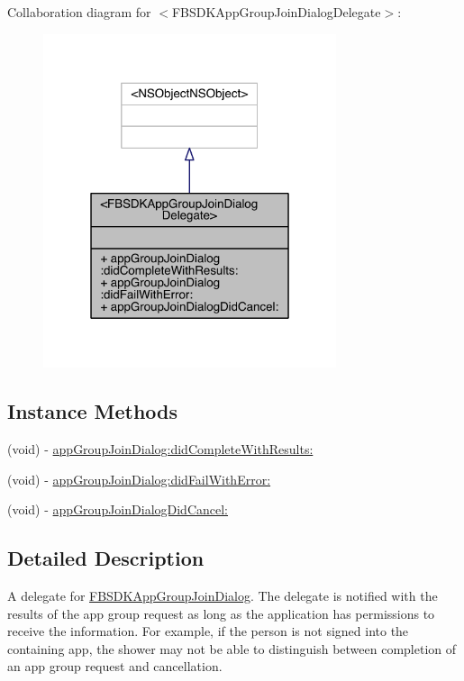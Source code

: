 Collaboration diagram for $<$F\-B\-S\-D\-K\-App\-Group\-Join\-Dialog\-Delegate$>$\-:
\nopagebreak
\begin{figure}[H]
\begin{center}
\leavevmode
\includegraphics[width=244pt]{protocol_f_b_s_d_k_app_group_join_dialog_delegate-p__coll__graph}
\end{center}
\end{figure}
\subsection*{Instance Methods}
\begin{DoxyCompactItemize}
\item 
(void) -\/ \hyperlink{protocol_f_b_s_d_k_app_group_join_dialog_delegate-p_a809da42b13fb800917b7b96b30ac4341}{app\-Group\-Join\-Dialog\-:did\-Complete\-With\-Results\-:}
\item 
(void) -\/ \hyperlink{protocol_f_b_s_d_k_app_group_join_dialog_delegate-p_a317e412e820965fdb565aac33f485172}{app\-Group\-Join\-Dialog\-:did\-Fail\-With\-Error\-:}
\item 
(void) -\/ \hyperlink{protocol_f_b_s_d_k_app_group_join_dialog_delegate-p_af7e3430110b339e8115f3b79f766cfb3}{app\-Group\-Join\-Dialog\-Did\-Cancel\-:}
\end{DoxyCompactItemize}


\subsection{Detailed Description}
A delegate for \hyperlink{interface_f_b_s_d_k_app_group_join_dialog}{F\-B\-S\-D\-K\-App\-Group\-Join\-Dialog}.  The delegate is notified with the results of the app group request as long as the application has permissions to receive the information. For example, if the person is not signed into the containing app, the shower may not be able to distinguish between completion of an app group request and cancellation. 

